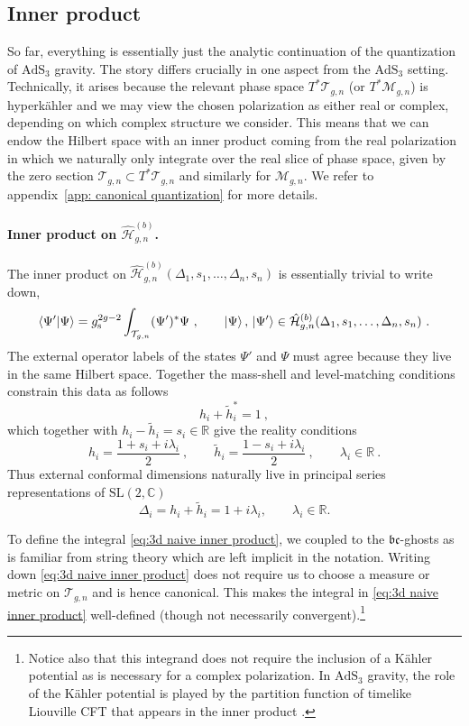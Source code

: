 \documentclass[12pt,a4paper]{article}
\newcommand{\be}{\begin{equation}}
\newcommand{\ee}{\end{equation}}
\newcommand\SL{\text{SL}}
\newcommand\RR{\mathbb{R}}
\begin{document}
\subsection{Inner product} 
So far, everything is essentially just the analytic continuation of the quantization of $\mathrm{AdS}_3$ gravity. The story differs crucially in one aspect from the $\mathrm{AdS}_3$ setting. Technically, it arises because the relevant phase space $T^* \mathcal{T}_{g,n}$ (or $T^* \mathcal{M}_{g,n}$) is hyperk\"ahler and we may view the chosen polarization as either real or complex, depending on which complex structure we consider. This means that we can endow the Hilbert space with an inner product coming from the real polarization in which we naturally only integrate over the real slice of phase space, given by the zero section $\mathcal{T}_{g,n} \subset T^* \mathcal{T}_{g,n}$ and similarly for $\mathcal{M}_{g,n}$. We refer to appendix~\ref{app: canonical quantization} for more details. 
\paragraph{Inner product on $\hat{\mathcal{H}}_{g,n}^{(b)}$.} The inner product on $\hat{\mathcal{H}}_{g,n}^{(b)}(\Delta_1,s_1,\ldots,\Delta_n,s_n)$ is essentially trivial to write down, 
\be 
\langle \Psi' | \Psi \rangle = g_\text{s}^{2g-2}\int_{\mathcal{T}_{g,n}}  (\Psi')^* \Psi~, \qquad \ket{\Psi},\, \ket{\Psi'} \in \hat{\mathcal{H}}^{(b)}_{g,n}(\Delta_1,s_1,\ldots,\Delta_n,s_n)~. \label{eq:3d naive inner product}
\ee
The external operator labels of the states $\Psi'$ and $\Psi$ must agree because they live in the same Hilbert space. Together the mass-shell and level-matching conditions constrain this data as follows
\be 
h_i+\tilde{h}_i^*=1~,
\ee
which together with $h_i-\tilde{h}_i=s_i \in \RR$ give the reality conditions
\be 
h_i=\frac{1+s_i+i \lambda_i}{2}~, \qquad \tilde{h}_i=\frac{1-s_i+i \lambda_i}{2}~, \qquad \lambda_i \in \mathbb{R}~. \label{eq:h htilde reality conditions}
\ee
Thus external conformal dimensions naturally live in principal series representations of $\SL(2,\mathbb{C})$
\begin{equation}
    \Delta_i = h_i + \tilde h_i =  1 + i\lambda_i, \qquad \lambda_i\in\mathbb{R}.
\end{equation}

To define the integral \eqref{eq:3d naive inner product}, we coupled to the $\mathfrak{bc}$-ghosts as is familiar from string theory which are left implicit in the notation.  Writing down \eqref{eq:3d naive inner product} does not require us to choose a measure or metric on $\mathcal{T}_{g,n}$ and is hence canonical.
This makes the integral in \eqref{eq:3d naive inner product} well-defined (though not necessarily convergent).\footnote{Notice also that this integrand does not require the inclusion of a K\"ahler potential as is necessary for a complex polarization. In $\mathrm{AdS}_3$ gravity, the role of the K\"ahler potential is played by the partition function of timelike Liouville CFT that appears in the inner product \cite{Verlinde:1989ua, Collier:2023fwi}.} 
\end{document}
